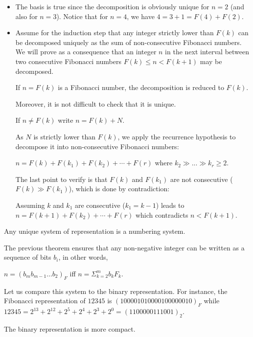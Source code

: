 \begin{itemize}
\item
The basis is true since the decomposition is obviously unique for $n=2$ (and also for $n=3$). 
Notice that for $n=4$, we have $4 = 3 + 1 = F(4) + F(2)$. 

\item
Assume for the induction step that any integer strictly lower than $F(k)$ can be decomposed uniquely as the sum of non-consecutive Fibonacci numbers.
We will prove as a consequence that an integer $n$ in the next interval between two consecutive Fibonacci numbers $F(k) \leq n < F(k+1)$ may be decomposed. 

If $n=F(k)$ is a Fibonacci number, the decomposition is reduced to $F(k)$.

Moreover, it is not difficult to check that it is unique.


\medskip

If $n \neq F(k)$ write $n = F(k) + N$.

As $N$ is strictly lower than $F(k)$, we apply the recurrence hypothesis to decompose it into non-consecutive Fibonacci numbers:

$n = F(k) + F(k_1) + F(k_2) + \cdots + F(r)$ where $k_2 \gg ... \gg k_r \geq 2$. 

The last point to verify is that $F(k)$ and $F(k_1)$ are not consecutive ($F(k) \gg F(k_1)$), which is done by contradiction:

Assuming $k$ and $k_1$ are consecutive ($k_1=k-1$) leads to $n = F(k+1) + F(k_2) + \cdots + F(r)$
which contradicts $n < F(k+1)$.
\end{itemize}

Any unique system of representation is a numbering system.

The previous theorem ensures that any non-negative integer can be written
as a sequence of bits $b_i$, in other words,

$n = (b_mb_{m-1}...b_2)_F$ iff $n = \Sigma_{k=2}^m b_k F_k$.

Let us compare this system to the binary representation.
For instance, the Fibonacci representation of $12345$ is $(100001010000100000010)_F$
while  $12345 = 2^{13} + 2^{12} + 2^{5} + 2^{4} + 2^{3} + 2^{0} = (1100000111001)_2$.

The binary representation is more compact. 
\bigskip

